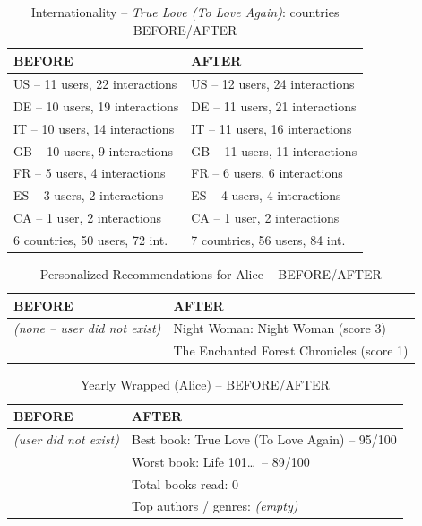 \begin{table}[H]
    \centering\small
    \caption{Internationality -- \textit{True Love (To Love Again)}: countries BEFORE/AFTER}
    \label{tab:internationality_book_after}
    \begin{tabular}{@{}ll@{}}
        \toprule
        \textbf{BEFORE} & \textbf{AFTER} \\ \midrule
        US -- 11 users, 22 interactions & US -- 12 users, 24 interactions \\
        DE -- 10 users, 19 interactions & DE -- 11 users, 21 interactions \\
        IT -- 10 users, 14 interactions & IT -- 11 users, 16 interactions \\
        GB -- 10 users,  9 interactions & GB -- 11 users, 11 interactions \\
        FR --  5 users,  4 interactions & FR --  6 users,  6 interactions \\
        ES --  3 users,  2 interactions & ES --  4 users,  4 interactions \\
        CA --  1 user,   2 interactions & CA --  1 user,   2 interactions \\
        \midrule
        6 countries, 50 users, 72 int. & 7 countries, 56 users, 84 int. \\
        \bottomrule
    \end{tabular}
\end{table}

\begin{table}[H]
    \centering\small
    \caption{Personalized Recommendations for Alice -- BEFORE/AFTER}
    \label{tab:recommendations_alice}
    \begin{tabular}{@{}ll@{}}
        \toprule
        \textbf{BEFORE} & \textbf{AFTER} \\ \midrule
        \textit{(none -- user did not exist)} & Night Woman: Night Woman (score 3) \\
        & The Enchanted Forest Chronicles (score 1) \\
        \bottomrule
    \end{tabular}
\end{table}

\begin{table}[H]
    \centering\small
    \caption{Yearly Wrapped (Alice) -- BEFORE/AFTER}
    \label{tab:wrapped_alice}
    \begin{tabular}{@{}ll@{}}
        \toprule
        \textbf{BEFORE} & \textbf{AFTER} \\ \midrule
        \textit{(user did not exist)} & Best book: True Love (To Love Again) -- 95/100 \\
        & Worst book: Life 101\ldots\ -- 89/100 \\
        & Total books read: 0 \\
        & Top authors / genres: \textit{(empty)} \\
        \bottomrule
    \end{tabular}
\end{table}

